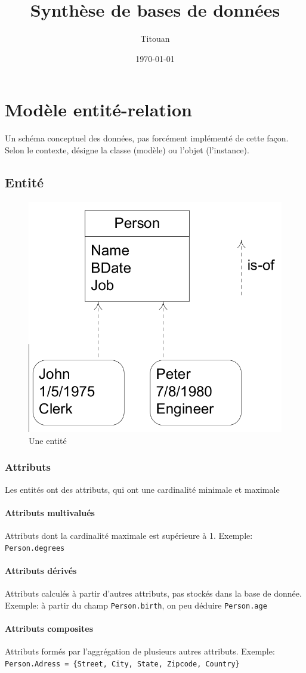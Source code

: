 \documentclass[a4paper]{article}
\author{Titouan \bsc{Christophe}}
\title{Synthèse de bases de données}
\date{\today}
\begin{document}
\maketitle
\tableofcontents

\section{Modèle entité-relation}
Un schéma conceptuel des données, pas forcément implémenté de cette façon.
Selon le contexte, désigne la classe (modèle) ou l'objet (l'instance).

\subsection{Entité}
\begin{figure}[H]
    \center
    \includegraphics[width=.3\textwidth]{fig/entity.png}
    \caption{Une entité}
\end{figure}

\subsubsection{Attributs}
Les entités ont des attributs, qui ont une cardinalité minimale et maximale

\paragraph{Attributs multivalués}
Attributs dont la cardinalité maximale est supérieure à 1.
Exemple: \texttt{Person.degrees}

\paragraph{Attributs dérivés}
Attributs calculés à partir d'autres attributs, pas stockés dans la base de donnée.
Exemple: à partir du champ \texttt{Person.birth}, on peu déduire \texttt{Person.age}

\paragraph{Attributs composites}
Attributs formés par l'aggrégation de plusieurs autres attributs.
Exemple: \texttt{Person.Adress = \{Street, City, State, Zipcode, Country\}}
\end{document}
